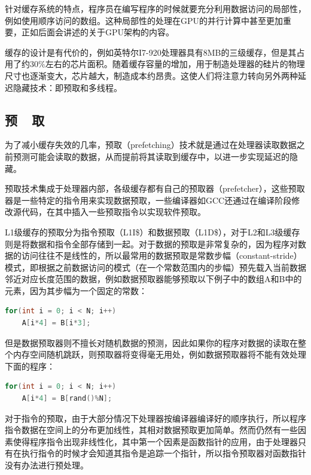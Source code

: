 针对缓存系统的特点，程序员在编写程序的时候就要充分利用数据访问的局部性，例如使用顺序访问的数组。这种局部性的处理在GPU的并行计算中甚至更加重要，正如后面会讲述的关于GPU架构的内容。

缓存的设计是有代价的，例如英特尔I7-920处理器具有8MB的三级缓存，但是其占用了约$30\%$左右的芯片面积。随着缓存容量的增加，用于制造处理器的硅片的物理尺寸也逐渐变大，芯片越大，制造成本约昂贵。这使人们将注意力转向另外两种延迟隐藏技术：即预取和多线程。




\subsection{预~~取}
为了减小缓存失效的几率，预取（prefetching）技术就是通过在处理器读取数据之前预测可能会读取的数据，从而提前将其读取到缓存中，以进一步实现延迟的隐藏。

预取技术集成于处理器内部，各级缓存都有自己的预取器（prefetcher），这些预取器是一些特定的指令用来实现数据预取，一些编译器如GCC还通过在编译阶段修改源代码，在其中插入一些预取指令以实现软件预取。

L1级缓存的预取分为指令预取（L1I\$）和数据预取（L1D\$），对于L2和L3级缓存则是将数据和指令全部存储到一起。对于数据的预取是非常复杂的，因为程序对数据的访问往往不是线性的，所以最常用的数据预取是常数步幅（constant-stride）模式，即根据之前数据访问的模式（在一个常数范围内的步幅）预先载入当前数据邻近对应长度范围的数据，例如数据预取器能够预取以下例子中的数组A和B中的元素，因为其步幅为一个固定的常数：

\begin{lstlisting}[language=C++,mathescape]
for(int i = 0; i < N; i++)
    A[i*4] = B[i*3];
\end{lstlisting}

但是数据预取器则不擅长对随机数据的预测，因此如果你的程序对数据的读取在整个内存空间随机跳跃，则预取器将变得毫无用处，例如数据预取器将不能有效处理下面的程序：

\begin{lstlisting}[language=C++,mathescape]
for(int i = 0; i < N; i++)
    A[i*4] = B[rand()%N];
\end{lstlisting}

对于指令的预取，由于大部分情况下处理器按编译器编译好的顺序执行，所以程序指令数据在空间上的分布更加线性，其相对数据预取更加简单。然而仍然有一些因素使得程序指令出现非线性化，其中第一个因素是函数指针的应用，由于处理器只有在执行指令的时候才会知道其指令是追踪一个指针，所以指令预取器对函数指针没有办法进行预处理。

